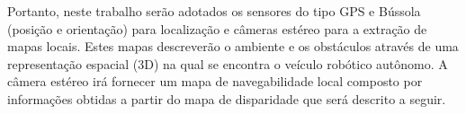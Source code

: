 \vspace{0.5cm}



Portanto, neste trabalho serão adotados os sensores do tipo GPS e Bússola
(posição e orientação) para localização e câmeras estéreo para a extração de
mapas locais. Estes mapas descreverão o ambiente e os obstáculos através de uma
representação espacial (3D) na qual se encontra o veículo robótico autônomo. A
câmera estéreo irá fornecer um mapa de navegabilidade local composto por
informações obtidas a partir do mapa de disparidade que será descrito a seguir.




